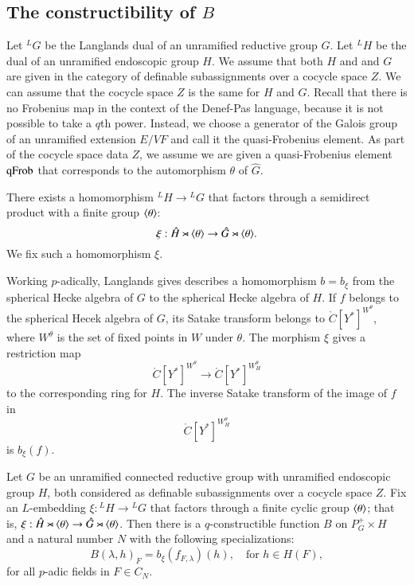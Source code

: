 \subsection{The constructibility of $B$}\label{sec:B}

Let ${}^LG$ be the Langlands dual of an unramified reductive group $G$.  Let ${}^LH$ be the dual of an
unramified endoscopic group $H$.  We assume that both $H$ and and $G$ are given in the category of definable subassignments
over a cocycle space $Z$.  We can assume that the cocycle space $Z$ is the same for $H$ and $G$.
Recall that there is no Frobenius map in the context of the Denef-Pas language, because it is not possible to take a $q$th power.
Instead, we choose a generator of the Galois group of an unramified extension $E/VF$ and call it the quasi-Frobenius element.
As part of the cocycle space data $Z$, we assume we are given a quasi-Frobenius element ${\operatorname{qFrob}}$ that corresponds
to the automorphism $\theta$ of $\hat G$.  

There exists a homomorphism ${}^LH\to {}^LG$ that factors through a semidirect product with a finite group $\langle{\theta}\rangle$:
\[
\xi:\hat H \rtimes \langle{\theta}\rangle \to \hat G \rtimes \langle{\theta}\rangle.
\]
We fix such a homomorphism $\xi$.  

Working $p$-adically, Langlands gives describes a homomorphism $b = b_\xi$
from the spherical Hecke algebra of $G$ to the spherical Hecke algebra of $H$.
If $f$ belongs to the spherical Hecek algebra of $G$, its Satake transform belongs
to $\ring{C}[Y^*]^{W^\theta}$, where $W^\theta$ is the set of fixed points in $W$ under $\theta$.
The morphism $\xi$ gives a restriction map
\[
\ring{C}[Y^*]^{W^\theta} \to \ring{C}[Y^*]^{W_H^\theta}
\]
to the corresponding ring for $H$.  The inverse Satake transform of the image of $f$ in
\[
\ring{C}[Y^*]^{W_H^\theta}
\]
is $b_\xi(f)$.

\begin{theorem}\label{thm:B}
Let $G$ be an unramified connected reductive group with unramified endoscopic group $H$, both considered as definable
subassignments over a cocycle space $Z$.  Fix an $L$-embedding $\xi:{}^LH\to {}^LG$ that factors through a finite
cyclic group $\langle{\theta}\rangle$; that is, $\xi:\hat H\rtimes \langle{\theta}\rangle \to \hat G \rtimes \langle{\theta}\rangle$.
Then
there is a $q$-constructible function $B$ on $P^+_G\times H$ and a natural number $N$ with the following specializations:
\[
B(\lambda,h)_F = b_\xi(f_{F,\lambda})(h),\quad \text{for } h\in H(F),
\]
for all $p$-adic fields in $F\in C_N$.  
\end{theorem}

